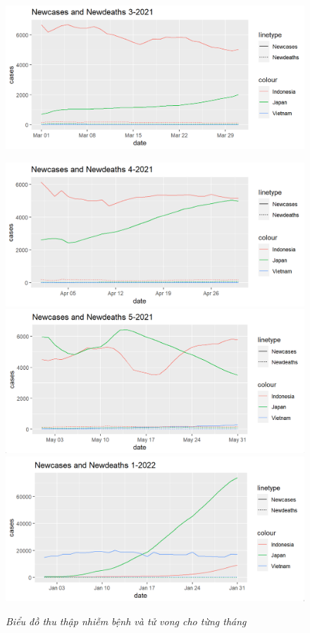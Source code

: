 \documentclass[a4paper]{article}
\theoremstyle{definition}
\begin{document}
\begin{enumerate}[1)]
\begin{figure}[H]
\begin{center}
			\includegraphics[scale=0.5]{vi/new_3_2021}
	    \end{center}
	\end{figure}

	
	\begin{figure}[H]
	    \begin{center}
			\includegraphics[scale=0.5]{vi/new_4_2021}
			\includegraphics[scale=0.5]{vi/new_5_2021}
			\includegraphics[scale=0.5]{vi/new_1_2022}
	    \end{center}
	   \vspace{+3mm}\caption{\it Biểu đồ thu thập nhiễm bệnh và tử vong cho từng tháng}
	   \end{figure}	
	   

\end{enumerate}
\end{document}
